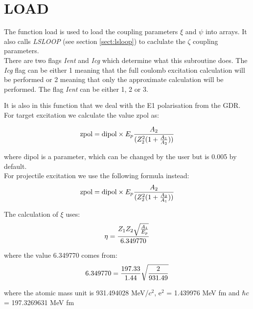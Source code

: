 \section{LOAD}
\label{sect:load}

The function load is used to load the coupling parameters $\xi$ and $\psi$
into arrays. It also calls {\em LSLOOP} (see section \ref{sect:lsloop}) to
caclulate the $\zeta$ coupling parameters.\\

\noindent There are two flags {\em Ient} and {\em Icg} which determine
what this subroutine does. The {\em Icg} flag can be either 1 meaning
that the full coulomb excitation calculation will be performed or 2
meaning that only the approximate calculation will be performed. The
flag {\em Ient} can be either 1, 2 or 3.

\noindent It is also in this function that we deal with the E1 polarisation from the
GDR. For target excitation we calculate the value zpol as:

\begin{equation}
\mathrm{zpol} = \mathrm{dipol} \times E_p {A_2 \over(Z_2^2 (1 + {A_1 \over
A_2}))}
\end{equation}

\noindent where dipol is a parameter, which can be changed by the user but is 0.005 by
default.\\

\noindent For projectile excitation we use the following formula instead:\\

\begin{equation}
\mathrm{zpol} = \mathrm{dipol} \times E_p {A_2 \over(Z_2^2 (1 + {A_2 \over
A_1}))}
\end{equation}

\noindent The calculation of $\xi$ uses:\\

\begin{equation}
\eta = {Z_1 Z_2 \sqrt{A_1 \over E_p} \over 6.349770}
\end{equation}

\noindent where the value 6.349770 comes from:\\

\begin{equation}
6.349770 = {197.33 \over 1.44} \sqrt{2 \over 931.49}
\end{equation}

\noindent where the atomic mass unit is 931.494028 MeV/$c^2$, e$^2$ =
1.439976 MeV fm and $\hbar c$ = 197.3269631 MeV fm\\

